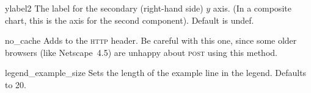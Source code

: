 \begin{AttrDecl}{ylabel2}
The label for the secondary (right-hand side) $y$ axis. (In a composite
chart, this is the axis for the second component). Default is undef.
\end{AttrDecl}

\begin{AttrDecl}{no\_cache}
Adds  to the \textsc{http} header.
Be careful with this one, since some older browsers (like Netscape~4.5)
are unhappy about \textsc{post} using this method.
\end{AttrDecl}

\begin{AttrDecl}{legend\_example\_size}
Sets the length of the example line in the legend. Defaults to 20.
\end{AttrDecl}

